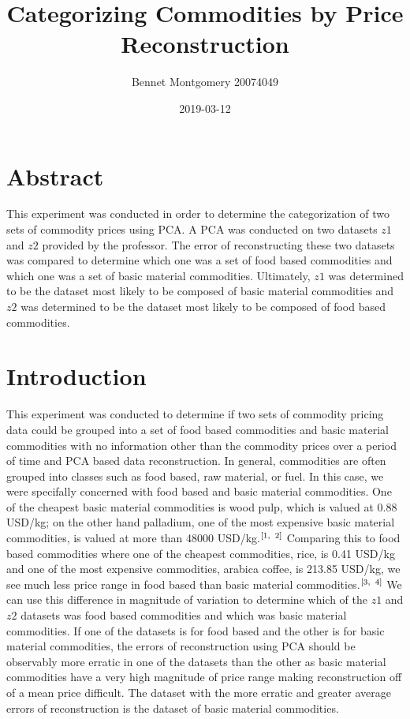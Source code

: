 \documentclass{article}
\title{Categorizing Commodities by Price Reconstruction}
\author{Bennet Montgomery 20074049}
\date{2019-03-12}
\begin{document}
	\maketitle
	
	\section*{Abstract}
	This experiment was conducted in order to determine the categorization of two sets of commodity prices using PCA. A PCA was conducted on two datasets $z1$ and $z2$ provided by the professor. The error of reconstructing these two datasets was compared to determine which one was a set of food based commodities and which one was a set of basic material commodities. Ultimately, $z1$ was determined to be the dataset most likely to be composed of basic material commodities and $z2$ was determined to be the dataset most likely to be composed of food based commodities. 
	\section*{Introduction}
	This experiment was conducted to determine if two sets of commodity pricing data could be grouped into a set of food based commodities and basic material commodities with no information other than the commodity prices over a period of time and PCA based data reconstruction. In general, commodities are often grouped into classes such as food based, raw material, or fuel. In this case, we were specifally concerned with food based and basic material commodities. One of the cheapest basic material commodities is wood pulp, which is valued at 0.88 USD/kg; on the other hand palladium, one of the most expensive basic material commodities, is valued at more than 48000 USD/kg.$^{[1, \hphantom{a} 2]}$ Comparing this to food based commodities where one of the cheapest commodities, rice, is 0.41 USD/kg and one of the most expensive commodities, arabica coffee, is 213.85 USD/kg, we see much less price range in food based than basic material commodities.$^{[3, \hphantom{a} 4]}$ We can use this difference in magnitude of variation to determine which of the $z1$ and $z2$ datasets was food based commodities and which was basic material commodities. If one of the datasets is for food based and the other is for basic material commodities, the errors of reconstruction using PCA should be observably more erratic in one of the datasets than the other as basic material commodities have a very high magnitude of price range making reconstruction off of a mean price difficult. The dataset with the more erratic and greater average errors of reconstruction is the dataset of basic material commodities.
	
\end{document}
